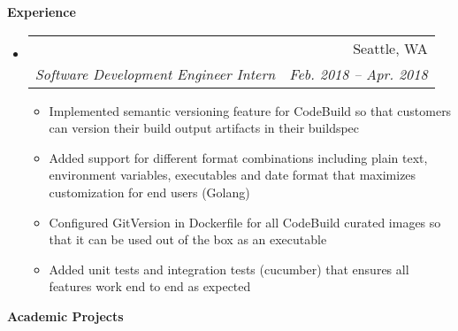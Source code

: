 \documentclass[letterpaper,11pt]{article}
\makeatletter
\newcommand{\resitem}[1]{
    \item #1
    \vspace{-2pt}
}
\newcommand{\resheading}[1]{{\large \colorbox{mygrey}{\begin{minipage}{\textwidth}{\textbf{#1 \vphantom{p\^{E}}}}\end{minipage}}}}
\newcommand{\ressubheading}[4]{
\begin{tabular*}{6.80in}{l@{\extracolsep{\fill}}r}
    \textbf{#1} & #2 \\
    \textit{#3} & \textit{#4} \\
\end{tabular*}\vspace{-6pt}}
\makeatother
\begin{document}

    \resheading{Experience}

    \begin{itemize}
        \item
        \ressubheading
        {\href
            {https://aws.amazon.com/codebuild/}
            {Amazon Web Services - AWS CodeBuild}
        }
        {Seattle, WA}
        {Software Development Engineer Intern}
        {Feb. 2018 -- Apr. 2018}
        {\footnotesize
        \begin{itemize} %
            \resitem
            {Implemented semantic versioning feature for CodeBuild so that
             customers can version their build output artifacts in their buildspec}
            \resitem
            {Added support for different format combinations including plain text, environment variables,
            executables and date format that maximizes customization for end users (Golang)}
            \resitem
            {Configured GitVersion in Dockerfile for all CodeBuild curated images so that
            it can be used out of the box as an executable}
            \resitem
            {Added unit tests and integration tests (cucumber) that ensures all features work end to end as expected}
        \end{itemize}
        }

    \end{itemize}


    \resheading{Academic Projects}
\end{document}
